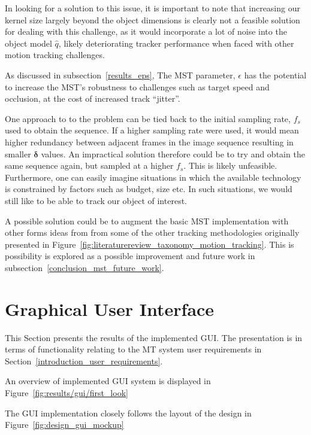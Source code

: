In looking for a solution to this issue, it is important to note that increasing
our kernel size largely beyond the object dimensions is clearly not a feasible solution
for dealing with this challenge, as it would incorporate a lot of noise into the
object model $\hat{q}$, likely deteriorating tracker performance when faced with
other motion tracking challenges.

As discussed in subsection~\ref{results_eps}, The MST parameter, $\epsilon$ has
the potential to increase the MST's robustness to challenges such as target
speed and occlusion, at the cost of increased track ``jitter''. 

One approach to to the problem can be tied back to the initial sampling rate,
$f_s$ used to obtain the sequence. If a higher sampling rate were used, it would
mean higher redundancy between adjacent frames in the image sequence resulting
in smaller $\mathbf{\delta}$ values. An impractical solution therefore could be to try
and obtain the same sequence again, but sampled at a higher $f_s$.
This is likely unfeasible. Furthermore, one can easily imagine situations in which the
available technology is constrained by factors such as budget, size etc. In such
situations, we would still like to be able to track our object of interest. 

A possible solution could be to augment the basic MST implementation with other
forms ideas from from some of the other tracking methodologies originally
presented in Figure~\ref{fig:literaturereview_taxonomy_motion_tracking}. This is
possibility is explored as a possible improvement and future work in
subsection~\ref{conclusion_mst_future_work}. 


\section{Graphical User Interface}\label{results_gui}
This Section presents the results of the implemented GUI. The presentation is in
terms of functionality relating to the MT system user requirements in
Section~\ref{introduction_user_requirements}.

An overview of implemented GUI system is displayed in Figure~\ref{fig:results/gui/first_look}

The GUI implementation closely follows the layout of the design in
Figure~\ref{fig:design_gui_mockup} 

